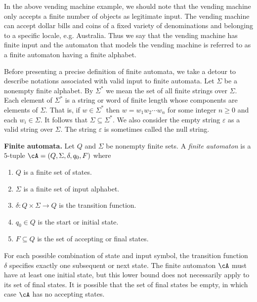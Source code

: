 In the above vending machine example, we should
note that the vending machine only accepts a finite number of objects
as legitimate input. The vending machine can accept dollar bills and
coins of a fixed variety of denominations and belonging to a specific
locale, e.g. Australia. Thus we say that the vending machine has
finite input and the automaton that models the vending machine is
referred to as a finite automaton having a finite alphabet.

Before presenting a precise definition of finite automata, we take a
detour to describe notations associated with valid input to finite
automata. Let $\Sigma$ be a nonempty finite
alphabet. By $\Sigma^\ast$ we mean the set of all
finite strings over $\Sigma$. Each element of
$\Sigma^\ast$ is a string or word of finite length whose
components are elements of $\Sigma$. That is, if $w \in \Sigma^\ast$
then $w = w_1 w_2 \cdots w_n$ for some integer $n \geq 0$ and each
$w_i \in \Sigma$. It follows that $\Sigma \subseteq \Sigma^{\ast}$.
We also consider the empty string $\varepsilon$ as a valid string over
$\Sigma$. The string $\varepsilon$ is sometimes called the null string.

\begin{definition}
\textbf{Finite automata.}
Let $Q$ and $\Sigma$ be nonempty finite sets.  A
\emph{finite automaton} is a $5$-tuple
$\cA = (Q, \Sigma, \delta, q_0, F)$ where
\begin{enumerate} \parskip=0.0in
  \item $Q$ is a finite set of states.

  \item $\Sigma$ is a finite set of input alphabet.

  \item $\delta : Q \times \Sigma \to Q$ is the
    transition function.

  \item $q_0 \in Q$ is the start or initial state.

  \item $F \subseteq Q$ is the set of accepting
    or final states.
\end{enumerate}
\end{definition}

For each possible combination of state and input symbol, the
transition function $\delta$ specifies exactly one subsequent or next
state. The finite automaton $\cA$ must have at least one initial
state, but this lower bound does not necessarily apply to its set of
final states. It is possible that the set of final states be empty, in
which case $\cA$ has no accepting states.


